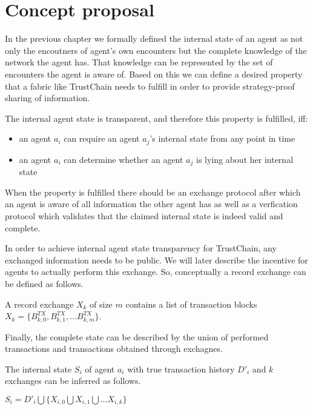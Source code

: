 \section{Concept proposal}
In the previous chapter we formally defined the internal state of an agent as not only the encoutners
of agent's own encounters but the complete knowledge of the network the agent has. That knowledge 
can be represented by the set of encounters the agent is aware of. Based on this we can define a 
desired property that a fabric like TrustChain needs to fulfill in order to provide strategy-proof 
sharing of information.

\begin{defn}
    The internal agent state is transparent, and therefore this property is fulfilled, iff:

    \begin{itemize}
        \item an agent $a_i$ can require an agent $a_j$'s internal state from any point in time
        \item an agent $a_i$ can determine whether an agent $a_j$ is lying about her internal state
    \end{itemize}
\end{defn}

When the property is fulfilled there should be an exchange protocol after which an agent is aware 
of all information the other agent has as well as a verfication protocol which validates that the 
claimed internal state is indeed valid and complete.

In order to achieve internal agent state transparency for TrustChain, any exchanged information
needs to be public. We will later describe the incentive for agents to actually perform
this exchange. So, conceptually a record exchange can be defined as follows.

\begin{defn}
    A record exchange $X_k$ of size $m$ contains a list of transaction blocks $X_k = \{ B^{TX}_{k,0}, B^{TX}_{k,1}, \dots B^{TX}_{k,m}\}$.
\end{defn}

Finally, the complete state can be described by the union of performed transactions and transactions
obtained through exchagnes.

\begin{defn}
    The internal state $S_i$ of agent $a_i$ with true transaction history $D'_i$ and $k$ exchanges
    can be inferred as follows.

    $S_i = D'_i \bigcup \{ X_{i,0} \bigcup X_{i,1} \bigcup \dots X_{i,k} \}$
\end{defn}

